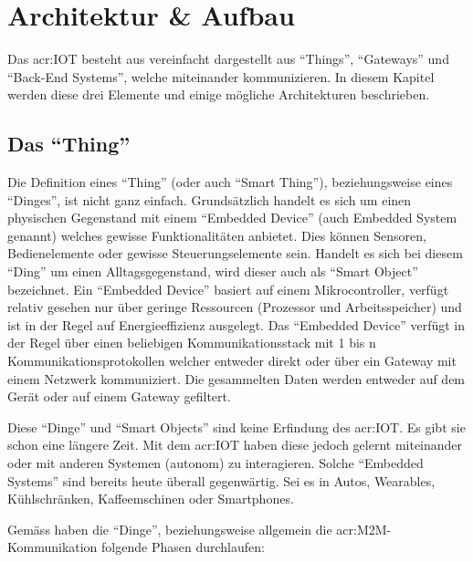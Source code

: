 \section{Architektur \& Aufbau}
Das \gls{acr:IOT} besteht aus vereinfacht dargestellt aus "`Things"', "`Gateways"' und "`Back-End Systems"', welche miteinander kommunizieren. In diesem Kapitel werden diese drei Elemente und einige mögliche Architekturen beschrieben.


\subsection{Das "`Thing"'}
Die Definition eines "`Thing"' (oder auch "`Smart Thing"'), beziehungsweise eines "`Dinges"', ist nicht ganz einfach. Grundsätzlich handelt es sich um einen physischen Gegenstand mit einem "`Embedded Device"' (auch Embedded System genannt) welches gewisse Funktionalitäten anbietet. Dies können Sensoren, Bedienelemente oder gewisse Steuerungselemente sein. Handelt es sich bei diesem "`Ding"' um einen Alltagsgegenstand, wird dieser auch als "`Smart Object"' bezeichnet. Ein "`Embedded Device"' basiert auf einem Mikrocontroller, verfügt relativ gesehen nur über geringe Ressourcen (Prozessor und Arbeitsspeicher) und ist in der Regel auf Energieeffizienz ausgelegt. Das "`Embedded Device"' verfügt in der Regel über einen beliebigen Kommunikationsstack mit 1 bis n Kommunikationsprotokollen welcher entweder direkt oder über ein Gateway mit einem Netzwerk kommuniziert. Die gesammelten Daten werden entweder auf dem Gerät oder auf einem Gateway gefiltert. 

Diese "`Dinge"' und "`Smart Objects"' sind keine Erfindung des \gls{acr:IOT}. Es gibt sie schon eine längere Zeit. Mit dem \gls{acr:IOT} haben diese jedoch gelernt miteinander oder mit anderen Systemen (autonom) zu interagieren. Solche "`Embedded Systems"' sind bereits heute überall gegenwärtig. Sei es in Autos, Wearables, Kühlschränken, Kaffeemschinen oder Smartphones.

Gemäss \cite{E:MachinaResearch:IoTWhitePaper} haben die "`Dinge"', beziehungsweise allgemein die \gls{acr:M2M}-Kommunikation folgende Phasen durchlaufen:

